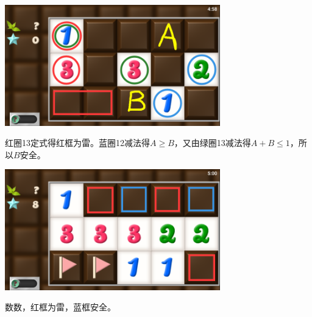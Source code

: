 \subsection{} %
\begin{center}
    \includegraphics[width=0.7\textwidth]{puzzle/75-1.png}
\end{center}
红圈13定式得红框为雷。蓝圈12减法得$A\ge B$，又由绿圈13减法得$A+B\le 1$，所以$B$安全。
\begin{center}
    \includegraphics[width=0.7\textwidth]{puzzle/75-2.png}
\end{center}
数数，红框为雷，蓝框安全。

